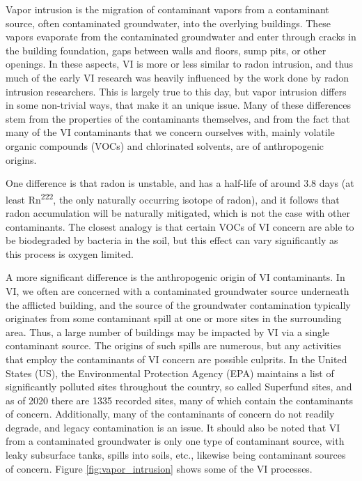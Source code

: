 Vapor intrusion is the migration of contaminant vapors from a contaminant source, often contaminated groundwater, into the overlying buildings.
These vapors evaporate from the contaminated groundwater and enter through cracks in the building foundation, gaps between walls and floors, sump pits, or other openings\cite{u.s._environmental_protection_agency_oswer_2015}.
In these aspects, VI is more or less similar to radon intrusion, and thus much of the early VI research was heavily influenced by the work done by radon intrusion researchers.
This is largely true to this day, but vapor intrusion differs in some non-trivial ways, that make it an unique issue.
Many of these differences stem from the properties of the contaminants themselves, and from the fact that many of the VI contaminants that we concern ourselves with, mainly volatile organic compounds (VOCs) and chlorinated solvents, are of anthropogenic origins.\par

One difference is that radon is unstable, and has a half-life of around 3.8 days (at least Rn\textsuperscript{222}, the only naturally occurring isotope of radon), and it follows that radon accumulation will be naturally mitigated, which is not the case with other contaminants\cite{schumacher_fluctuation_2012}.
The closest analogy is that certain VOCs of VI concern are able to be biodegraded by bacteria in the soil, but this effect can vary significantly as this process is oxygen limited\cite{u.s._environmental_protection_agency_oswer_2015,abreu_simulating_2006}.\par

A more significant difference is the anthropogenic origin of VI contaminants.
In VI, we often are concerned with a contaminated groundwater source underneath the afflicted building, and the source of the groundwater contamination typically originates from some contaminant spill at one or more sites in the surrounding area.
Thus, a large number of buildings may be impacted by VI via a single contaminant source.
The origins of such spills are numerous, but any activities that employ the contaminants of VI concern are possible culprits\cite{u.s._environmental_protection_agency_oswer_2015}.
In the United States (US), the Environmental Protection Agency (EPA) maintains a list of significantly polluted sites throughout the country, so called Superfund sites, and as of 2020 there are 1335 recorded sites, many of which contain the contaminants of concern\cite{us_epa_current_2015,u.s._environmental_protection_agency_oswer_2015}.
Additionally, many of the contaminants of concern do not readily degrade, and legacy contamination is an issue\cite{u.s._environmental_protection_agency_oswer_2015}.
It should also be noted that VI from a contaminated groundwater is only one type of contaminant source, with leaky subsurface tanks, spills into soils, etc., likewise being contaminant sources of concern.
Figure \ref{fig:vapor_intrusion} shows some of the VI processes.\par

